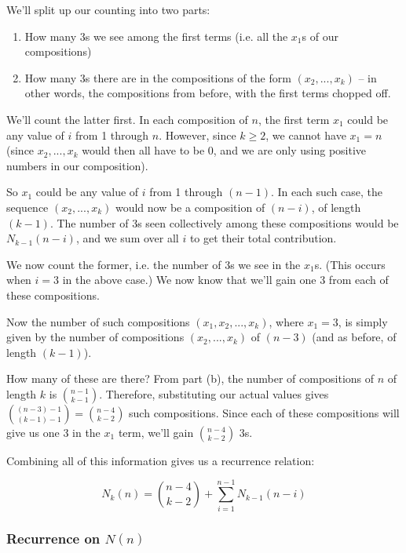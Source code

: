 We'll split up our counting into two parts:
\begin{enumerate}
\item How many 3s we see among the first terms (i.e. all the $x_1$s of our compositions)
\item How many 3s there are in the compositions of the form $(x_2, ..., x_k)$ -- in other words, the compositions from before, with the first terms chopped off.
\end{enumerate}

We'll count the latter first. In each composition of $n$, the first term $x_1$ could be any value of $i$ from 1 through $n$. However, since $k \geq 2$, we cannot have $x_1 = n$ (since $x_2, ..., x_k$ would then all have to be 0, and we are only using positive numbers in our composition). 

So $x_1$ could be any value of $i$ from 1 through $(n-1)$. In each such case, the sequence $(x_2, ..., x_k)$ would now be a composition of $(n-i)$, of length $(k-1)$. The number of 3s seen collectively among these compositions would be $N_{k-1}(n-i)$, and we sum over all $i$ to get their total contribution.

We now count the former, i.e. the number of 3s we see in the $x_1$s. (This occurs when $i = 3$ in the above case.) We now know that we'll gain one 3 from each of these compositions. 

Now the number of such compositions $(x_1, x_2, ..., x_k)$, where $x_1 = 3$, is simply given by the number of compositions $(x_2, ..., x_k)$ of $(n-3)$ (and as before, of length $(k-1)$). 

How many of these are there? From part (b), the number of compositions of $n$ of length $k$ is $\binom{n-1}{k-1}$. Therefore, substituting our actual values gives $\binom{(n-3)-1}{(k-1)-1} = \binom{n-4}{k-2}$ such compositions. Since each of these compositions will give us one 3 in the $x_1$ term, we'll gain $\binom{n-4}{k-2}$ 3s.

Combining all of this information gives us a recurrence relation:

\begin{equation} 
\label{composition-num-3s-nk-recurrence}
N_k(n) = \binom{n-4}{k-2} + \sum_{i=1}^{n-1} N_{k-1}(n-i)
\end{equation}


\subsubsection{Recurrence on $N(n)$}

